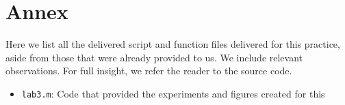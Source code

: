 \section{Annex}

Here we list all the delivered script and function files delivered for this practice,
aside from those that were already provided to us.
We include relevant observations. For full insight, we refer the reader to the
source code.

\begin{itemize}
	\item \texttt{lab3.m}: Code that provided the experiments and figures created for this 

\end{itemize}
